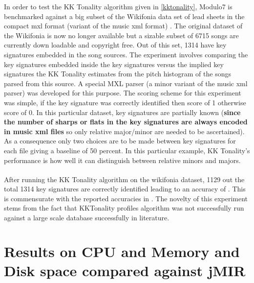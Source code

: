 \noindent In order to test the KK Tonality algorithm given in \ref{kktonality}, Modulo7 is benchmarked against a big subset of the Wikifonia data set of lead sheets in the compact mxl format (variant of the music xml format) \cite{WikifoniaDataset}. The original dataset of the Wikifonia is now no longer available but a sizable subset of 6715 songs are currently down loadable and copyright free. Out of this set, 1314 have key signatures embedded in the song sources. The experiment involves comparing the key signatures embedded inside the key signatures versus the implied key signatures the KK Tonality estimates from the pitch histogram of the songs parsed from this source. A special MXL parser (a minor variant of the music xml parser) was developed for this purpose. The scoring scheme for this experiment was simple, if the key signature was correctly identified then score of 1 otherwise score of 0. In this particular dataset, key signatures are partially known (\textbf{since the number of sharps or flats in the key signatures are always encoded in music xml files} so only relative major/minor are needed to be ascertained). As a consequence only two choices are to be made between key signatures for each file giving a baseline of 50 percent. In this particular example, KK Tonality's performance is how well it can distinguish between relative minors and majors. \\\\
After running the KK Tonality algorithm on the wikifonia dataset, 1129 out the total 1314 key signatures are correctly identified leading to an accuracy of . This is commensurate with the reported accuracies in \cite{kkTonalityKeyFinding}. The novelty of this experiment stems from the fact that KKTonality profiles algorithm was not successfully run against a large scale database successfully in literature. 

\section{Results on CPU and Memory and Disk space compared against jMIR}

